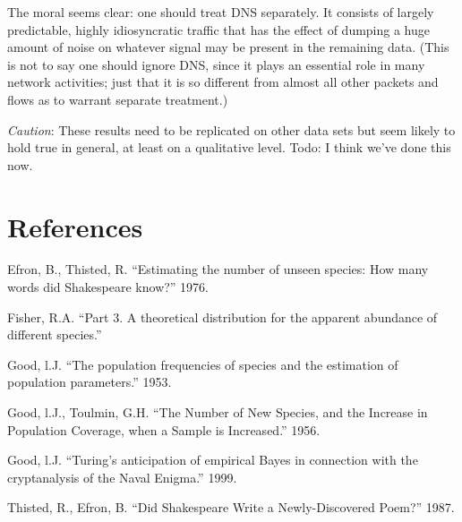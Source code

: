\documentclass{paper}
\begin{document}
The moral seems clear: one should treat DNS separately. It consists of largely
predictable, highly idiosyncratic traffic that has the effect of dumping a huge
amount of noise on whatever signal may be present in the remaining data. (This
is not to say one should ignore DNS, since it plays an essential role in many
network activities; just that it is so different from almost all other packets
and flows as to warrant separate treatment.)

\emph{Caution}: These results need to be replicated on other data sets but seem
likely to hold true in general, at least on a qualitative level. Todo: I think
we've done this now.

\section{References}
Efron, B., Thisted, R. ``Estimating the number of unseen species: How many words
did Shakespeare know?'' 1976.

Fisher, R.A. ``Part 3. A theoretical distribution for the apparent abundance of
different species.''

Good, l.J. ``The population frequencies of species and the estimation of
population parameters.'' 1953.

Good, l.J., Toulmin, G.H. ``The Number of New Species, and the Increase in
Population Coverage, when a Sample is Increased.'' 1956.

Good, l.J. ``Turing's anticipation of empirical Bayes in connection with the
cryptanalysis of the Naval Enigma.'' 1999.

Thisted, R., Efron, B. ``Did Shakespeare Write a Newly-Discovered Poem?'' 1987.
\end{document}
